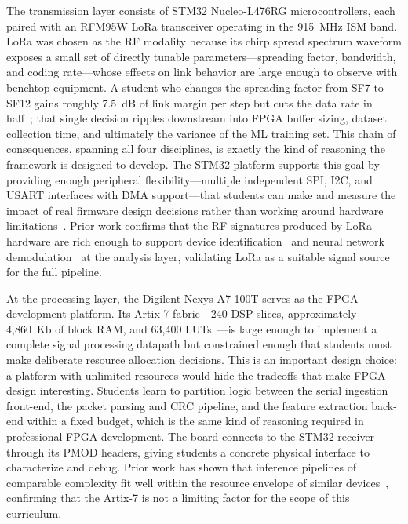 \documentclass[conference]{IEEEtran}
\begin{document}
{ The transmission layer consists of STM32 Nucleo-L476RG microcontrollers, each paired with an RFM95W LoRa transceiver operating in the 915~MHz ISM band. LoRa was chosen as the RF modality because its chirp spread spectrum waveform exposes a small set of directly tunable parameters---spreading factor, bandwidth, and coding rate---whose effects on link behavior are large enough to observe with benchtop equipment. A student who changes the spreading factor from SF7 to SF12 gains roughly 7.5~dB of link margin per step but cuts the data rate in half~\cite{b12}; that single decision ripples downstream into FPGA buffer sizing, dataset collection time, and ultimately the variance of the ML training set. This chain of consequences, spanning all four disciplines, is exactly the kind of reasoning the framework is designed to develop. The STM32 platform supports this goal by providing enough peripheral flexibility---multiple independent SPI, I2C, and USART interfaces with DMA support---that students can make and measure the impact of real firmware design decisions rather than working around hardware limitations~\cite{b10,b13}. Prior work confirms that the RF signatures produced by LoRa hardware are rich enough to support device identification~\cite{b6} and neural network demodulation~\cite{b8} at the analysis layer, validating LoRa as a suitable signal source for the full pipeline.}

At the processing layer, the Digilent Nexys A7-100T serves as the FPGA development platform. Its Artix-7 fabric---240 DSP slices, approximately 4,860~Kb of block RAM, and 63,400 LUTs~\cite{b11}---is large enough to implement a complete signal processing datapath but constrained enough that students must make deliberate resource allocation decisions. This is an important design choice: a platform with unlimited resources would hide the tradeoffs that make FPGA design interesting. Students learn to partition logic between the serial ingestion front-end, the packet parsing and CRC pipeline, and the feature extraction back-end within a fixed budget, which is the same kind of reasoning required in professional FPGA development. The board connects to the STM32 receiver through its PMOD headers, giving students a concrete physical interface to characterize and debug. Prior work has shown that inference pipelines of comparable complexity fit well within the resource envelope of similar devices~\cite{b1,b3}, confirming that the Artix-7 is not a limiting factor for the scope of this curriculum. %
\end{document}
